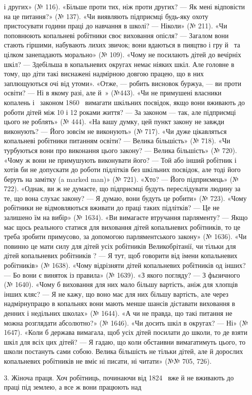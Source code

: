 \parcont{}  %
і других» (№ 116). «Більше проти тих, ніж проти других? — Як
мені відповісти на це питання?» (№ 137). «Чи виявляють підприємці
будь-яку охоту пристосувати години праці до навчання
в школі? — Ніколи» (№ 211). «Чи поповнюють копальневі
робітники своє виховання опісля? — Загалом вони стають гіршими,
набувають лихих звичок; вони вдаються в пияцтво і гру
й~ та цілком занепадають морально» (№ 109). «Чому не посилають
дітей до вечірніх шкіл? — Здебільша в копальневих округах
немає ніяких шкіл. Але головне в тому, що діти такі виснажені
надмірною довгою працею, що в них заплющуються очі від утоми».
«Отже, — робить висновок буржуа, — ви проти освіти? — Ні в
якому разі, але й~» (№443). «Чи не примушені власники
копалень і~ законом 1860~ вимагати шкільних посвідок,
якщо вони вживають до роботи дітей між 10 і 12 роками життя? —
За законом — так, але підприємці цього не роблять» (№ 444).
«На вашу думку, цей пункт закону не завжди виконують? —
Його зовсім не виконують» (№ 717). «Чи дуже цікавляться копальневі
робітники питанням освіти? — Велика більшість» (№ 718).
«Чи турбуються вони про виконання цього закону? — Велика
більшість» (№ 720). «Чому ж вони не примушують виконувати
його? — Той або інший робітник і хотів би не допускати до роботи
підлітків без шкільних посвідок, але тоді його беруть на замітку
(a marked man)» (№ 721). «Хто? — Його підприємець» (№ 722).
«Однак, ви ж не думаєте, що підприємці будуть переслідувати
людину за те, що вона слухає закону? — Я думаю, вони будуть
це робити» (№ 723). «Чому робітники не відмовляються вживати
до праці таких підлітків? — Це не залишено їм на вибір» (№ 1634).
«Ви вимагаєте втручання парляменту? — Якщо має щось реального
статися для виховання дітей копальневих робітників, то
це треба зробити примусово, за допомогою парляментського закону»
(№ 1636). «Чи повинно це мати силу для дітей усіх робітників
Великобрітанії, чи тільки для дітей копальневих робітників
? — Я тут, щоб говорити від імени копальневих робітників»
(№ 1638). «Чому відрізняти дітей копальневих робітників од
інших? — Бо вони є виняток із правила» (№ 1639). «З якого
погляду? — З фызичного (№ 1640). «Чому б виховання для них мало більшу вартість,
аніж для хлопців інших кляс? — Я не кажу, що воно має для них більшу вартість,
але через надмірнупрацю в копальнях вони мають менше шансів діставати
виховання в денних і недільних школах» (№ 1644). «А чи не правда, що такі
питання не можна розглядати абсолютно?» (№ 1646). «Чи досить шкіл в округах? —
Ні» (№ 1647). «Коли б держава вимагала, щоб усіх дітей посилати до школи, то де
взяти шкіл для всіх цих дітей? — Я гадаю, що коли обстаивни вимагатимуть цього,
то школи постануть сами собою. Велика більшість не тільки дітей, але й дорослих
копальневих робітників не вміє ні писати, ні читати» (№№ 705, 726).

3. Жіноча праця. Хоч робітниць, починаючи від 1824~ вже
й не вживають до праці під землею, а все ж вони працюють над \parbreak{}  %
